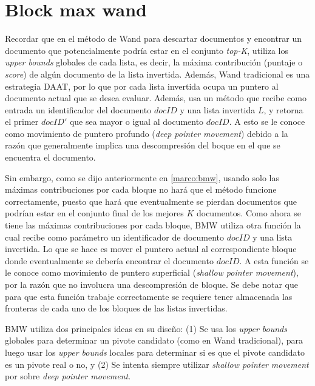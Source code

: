 \section{Block max wand}
Recordar que en el método de Wand para descartar documentos y encontrar un documento que potencialmente podría estar en el conjunto \textit{top-K}, utiliza los \textit{upper bounds} globales de cada lista, es decir, la máxima contribución (puntaje o \textit{score}) de algún documento de la lista invertida. Además, Wand tradicional es una estrategia DAAT, por lo que por cada lista invertida ocupa un puntero al documento actual que se desea evaluar. Además, usa un método que recibe como entrada un identificador del documento $docID$ y una lista invertida $L$, y retorna el primer $docID'$ que sea mayor o igual al documento $docID$. A esto se le conoce como movimiento de puntero profundo (\textit{deep pointer movement}) debido a la razón que generalmente implica una descompresión del boque en el que se encuentra el documento.

Sin embargo, como se dijo anteriormente en \ref{marco:bmw}, usando solo las máximas contribuciones por cada bloque no hará que el método funcione correctamente, puesto que hará que eventualmente se pierdan documentos que podrían estar en el conjunto final de los mejores $K$ documentos. Como ahora se tiene las máximas contribuciones por cada bloque, BMW utiliza otra función la cual recibe como parámetro un identificador de documento $docID$ y una lista invertida. Lo que se hace es mover el puntero actual al correspondiente bloque donde eventualmente se debería encontrar el documento $docID$. A esta función se le conoce como movimiento de puntero superficial (\textit{shallow pointer movement}), por la razón que no involucra una descompresión de bloque. Se debe notar que para que esta función trabaje correctamente se requiere tener almacenada las fronteras de cada uno de los bloques de las listas invertidas.

BMW utiliza dos principales ideas en su diseño: (1) Se usa los \textit{upper bounds} globales para determinar un pivote candidato (como en Wand tradicional), para luego usar los \textit{upper bounds} locales para determinar si es que el pivote candidato es un pivote real o no, y (2) Se intenta siempre utilizar \textit{shallow pointer movement} por sobre \textit{deep pointer movement}.


